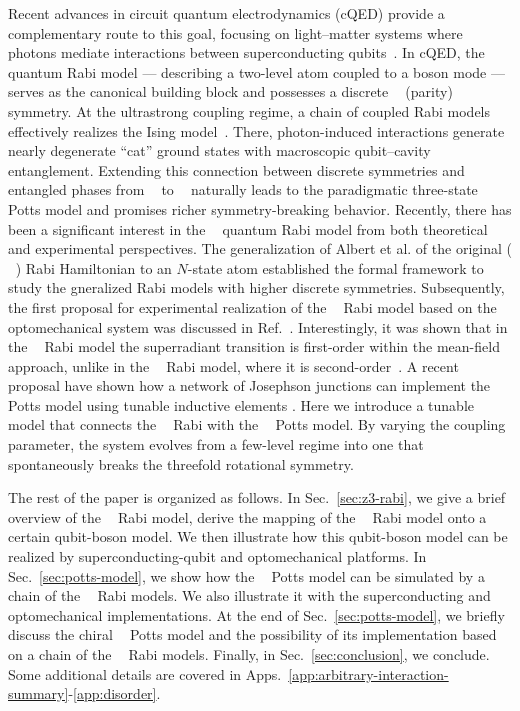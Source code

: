 \documentclass[reprint, aps, prx, amsmath, amssymb, longbibliography, superscriptaddress]{revtex4-2}
\DeclareMathOperator{\Zthree}{\mathbb{Z}_3}
\DeclareMathOperator{\Ztwo}{\mathbb{Z}_2}
\begin{document}
Recent advances in circuit quantum electrodynamics (cQED) provide a complementary route to this goal, focusing on light–matter systems where photons mediate interactions between superconducting qubits~\cite{kurpiers_deterministic_2018,vanloo_photonmediated_2013,astafiev_resonance_2010}. In cQED, the quantum Rabi model \cite{braumuller_analog_2017, braak_integrability_2011,hwang_quantum_2015, chen_shortcuts_2021} --- describing a two-level atom coupled to a boson mode --- serves as the canonical building block and possesses a discrete $\Ztwo $ (parity) symmetry. At the ultrastrong coupling regime, a chain of coupled Rabi models effectively realizes the Ising model~\cite{hwang_largescale_2013}. There, photon-induced interactions generate nearly degenerate “cat” ground states with macroscopic qubit–cavity entanglement. Extending this connection between discrete symmetries and entangled phases from $\Ztwo$ to $\Zthree$ \cite{albert_quantum_2012, zhang_z_n_2014, sedov_chiral_2020, kozin_quantum_2024} naturally leads to the paradigmatic three-state Potts model and promises richer symmetry-breaking behavior.
Recently, there has been a significant interest in the $\Zthree$ quantum Rabi model from both theoretical and experimental perspectives. 
The generalization of Albert et al. of the original ($\Ztwo$) Rabi Hamiltonian to an $N$-state atom  \cite{albert_quantum_2012} established the formal framework to study the gneralized Rabi models with higher discrete symmetries. Subsequently, the first proposal for experimental realization of the $\Zthree$ Rabi model based on the optomechanical system was discussed in Ref.~\cite{sedov_chiral_2020}. Interestingly, it was shown that in the $\Zthree$ Rabi model the superradiant transition is first-order within the mean-field approach, unlike in the $\Ztwo$ Rabi model, where it is second-order~\cite{sedov_chiral_2020}. A recent proposal have shown how a network of Josephson junctions can implement the $\Zthree$ Potts model using tunable inductive elements \cite{wauters_engineering_2024}. Here we introduce a tunable model that connects the $\Zthree$ Rabi with the $\Zthree$ Potts model. By varying the coupling parameter, the system evolves from a few-level regime into one that spontaneously breaks the threefold rotational symmetry. 

The rest of the paper is organized as follows. In Sec.~\ref{sec:z3-rabi}, we give a brief overview of the $\Zthree$ Rabi model, derive the mapping of the $\Zthree$ Rabi model onto a certain qubit-boson model. We then illustrate how this qubit-boson model can be realized by superconducting-qubit and optomechanical platforms. In Sec.~\ref{sec:potts-model}, we show how the $\Zthree$ Potts model can be simulated by a chain of the $\Zthree$ Rabi models. We also illustrate it with the superconducting and optomechanical implementations. At the end of Sec.~\ref{sec:potts-model}, we briefly discuss the chiral $\Zthree$ Potts model and the possibility of its implementation based on a chain of the $\Zthree$ Rabi models. Finally, in Sec.~\ref{sec:conclusion}, we conclude. Some additional details are covered in Apps.~\ref{app:arbitrary-interaction-summary}-\ref{app:disorder}.
\end{document}
